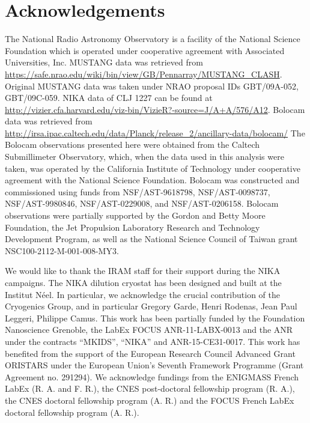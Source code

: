 \documentclass[twocolumn,traditabstract]{aa}
\begin{document}
\section*{Acknowledgements}

The National Radio Astronomy Observatory is a facility of the National Science Foundation which is operated
under cooperative agreement with Associated Universities, Inc. MUSTANG data was retrieved from
\url{https://safe.nrao.edu/wiki/bin/view/GB/Pennarray/MUSTANG_CLASH}. Original MUSTANG data was
taken under NRAO proposal IDs GBT/09A-052, GBT/09C-059. NIKA data of CLJ 1227 can be found at
\url{http://vizier.cfa.harvard.edu/viz-bin/VizieR?-source=J/A+A/576/A12}. Bolocam data was retrieved from
\url{http://irsa.ipac.caltech.edu/data/Planck/release\_2/ancillary-data/bolocam/}
The Bolocam observations presented here were obtained from the Caltech Submillimeter Observatory, which,
when the data used in this analysis were taken, was operated by the California Institute of Technology under
cooperative agreement with the National Science Foundation. Bolocam was constructed and commissioned using funds
from NSF/AST-9618798, NSF/AST-0098737, NSF/AST-9980846, NSF/AST-0229008, and NSF/AST-0206158. Bolocam observations
were partially supported by the Gordon and Betty Moore Foundation, the Jet Propulsion Laboratory Research and
Technology Development Program, as well as the National Science Council of Taiwan grant NSC100-2112-M-001-008-MY3.

We would like to thank the IRAM staff for their support during the NIKA campaigns. 
The NIKA dilution cryostat has been designed and built at the Institut N\'eel. 
In particular, we acknowledge the crucial contribution of the Cryogenics Group, and 
in particular Gregory Garde, Henri Rodenas, Jean Paul Leggeri, Philippe Camus. 
This work has been partially funded by the Foundation Nanoscience Grenoble, the LabEx FOCUS ANR-11-LABX-0013 and 
the ANR under the contracts ``MKIDS'', ``NIKA'' and ANR-15-CE31-0017. 
This work has benefited from the support of the European Research Council Advanced Grant ORISTARS 
under the European Union's Seventh Framework Programme (Grant Agreement no. 291294).
We acknowledge fundings from the ENIGMASS French LabEx (R. A. and F. R.), 
the CNES post-doctoral fellowship program (R. A.), the CNES doctoral fellowship program (A. R.) and 
the FOCUS French LabEx doctoral fellowship program (A. R.).

\end{document}
